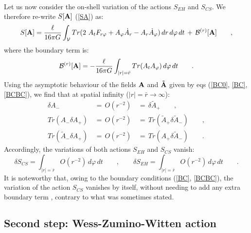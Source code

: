 \documentclass[a4paper,10pt]{article}
\begin{document}
Let us now consider the on-shell 
variation of the actions $S_{EH}$ and $S_{CS}$. 
We therefore re-write $S[\bf A]$ (\ref{SA}) as: 
\begin{equation} 
\label{21} 
S[{\bf A}] = \frac {\ell}  {16 \pi G}  
\int_{\cal V}{ Tr (2\ A_t F_{r\varphi} + A 
_{\varphi}\dot A_r -A_r \dot A_{\varphi} )} 
 \, dr \, d\varphi \, dt \, + \, {\cal B}^{(r)}[{\bf A}]  
\qquad,  
\end{equation} 
where the boundary term is: 
\begin{equation} 
{\cal B}^{(r)}[{\bf A}] = - \frac {\ell}  {16 \pi G}  
\int_{|r|=\bar r} Tr (A_t A_\varphi) \, d\varphi\, dt 
\qquad .
\end{equation} 
Using the asymptotic behaviour of the fields ${\bf A}$ and ${\bf \tilde A}$ 
given by eqs (\ref{BC0}, \ref{BC}, \ref{BCBC}), 
we find that at spatial infinity 
($|r|=\bar r \rightarrow \infty$):  
\begin{eqnarray} 
\label{dBC1} 
\delta A_{-} \, &= \, O(r^{-2}) \, &= \, \delta \tilde A_{+} \qquad, \\ 
\label{dBC2} 
Tr (A_{-} \delta A_{+}) \, &= \, O(r^{-2}) \, &= \,  
Tr (\tilde A_{+} \delta \tilde A_{-}) 
 \qquad ,\\ 
\label{dBC3} 
Tr ( \tilde A_{-} \delta A_{+}) \, &= \, O(r^{-2}) \, &= \,  
Tr ( A_{+} \delta \tilde A_{-} ) \qquad . 
\end{eqnarray} 
Accordingly, the variations of both actions 
$S_{EH}$ and $S_{CS}$ vanish:
\begin{equation} 
\delta S_{CS}=
\int_{|r|=\bar r} O(r^{-2}) \, d\varphi\, dt \qquad , \qquad 
\delta S_{EH}=
\int_{|r|=\bar r} O(r^{-2}) \, d\varphi\, dt \qquad . 
\end{equation} 
It is noteworthy that, owing to the boundary conditions  
(\ref{BC}, \ref{BCBC}),  
the variation of the action $S_{CS}$ vanishes by itself,  
without needing to add any extra boundary term \cite{FE}, contrary to
what was sometimes stated.

\subsection{Second step: Wess-Zumino-Witten action}
\end{document}
